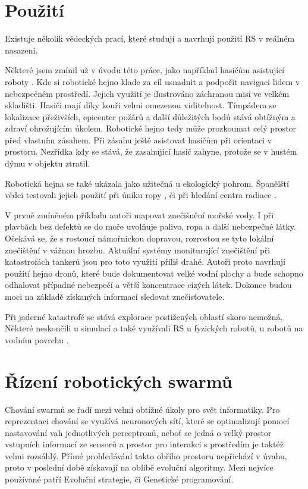 \section{Použití}
Existuje několik vědeckých prací, které studují a navrhují použití RS v reálném nasazení. 
\par 
Některé jsem zmínil už v úvodu této práce, jako například hasičům asistující roboty \citep{fireRobots}.  Kde si robotické hejno klade za cíl usnadnit a podpořit navigaci lidem v nebezpečném prostředí. Jejich využití je ilustrováno záchranou misí ve velkém skladišti. Hasiči mají díky kouři velmi omezenou viditelnost. Tímpádem se lokalizace přeživších, epicenter požárů a další důležitých bodů stává obtížným a zdraví ohrožujícím úkolem. Robotické hejno tedy může prozkoumat celý prostor před vlastním zásahem. Při zásahu ještě asistovat hasičům při orientaci v prostoru. Nezřídka kdy se stává, že zasahující hasič zahyne, protože se v hustém dýmu v objektu ztratil.
\par
Robotická hejna se také ukázala jako užitečná u ekologický pohrom. Španělští vědci testovali jejich použití při úniku ropy \citep{oilSwarm}, či při hledání centra radiace \citep{radiationSwarm}. 
\par 
V prvně zmíněném příkladu autoři mapovat znečišnění mořské vody. I při plavbách bez defektů se do moře uvolňuje palivo, ropa a další nebezpečné látky. Očekává se, že s rostoucí námořnickou dopravou, rozrostou se tyto lokální znečištění v vážnou hrozbu. Aktuální systémy moniturující znečištění při katastrofách tankerů jsou pro toto využití příliš drahé. Autoři proto navrhují použití hejno dronů, které bude dokumentovat velké vodní plochy a bude schopno odhalovat případné nebezpečí a větší koncentrace cizých látek. Dokonce budou moci na základě získaných informací sledovat znečisťovatele. 
\par
Při jaderné katastrofě se stává explorace postižených oblastí skoro nemožná. 
Některé neskončili u simulací a také využívali RS u fyzických robotů, u robotů na vodním povrchu \citep{aquaticRobots}. 

\section{Řízení robotických swarmů}
Chování swarmů se řadí mezi velmi obtížné úkoly pro svět informatiky. Pro reprezentaci chování se využívá neuronových sítí, které se optimalizují pomocí nastavování vah jednotlivých perceptronů, neboť se jedná o velký prostor vstupních informací ze sensorů a prostor pro interakci s prostředím je taktéž velmi rozsáhlý. Přímé prohledávání takto obřího prostoru nepřichází v úvahu, proto v poslední době získavají na oblibě evoluční algoritmy. Mezi nejvíce používané patří Evoluční strategie, či Genetické programování. \par 

